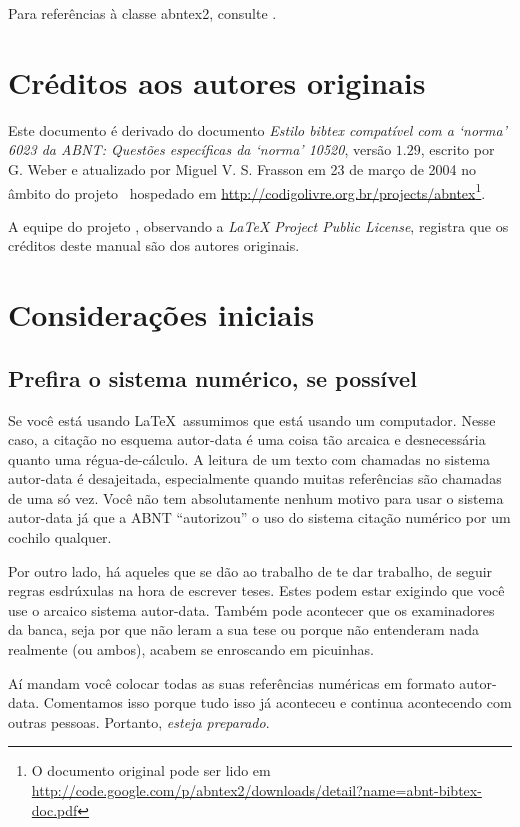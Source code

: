 \documentclass[a4paper]{ltxdoc}
\begin{document}
Para referências à classe \textsf{abntex2}, consulte .

\section{Créditos aos autores originais}

Este documento é derivado do documento \emph{Estilo bibtex compatível com a
`norma' 6023 da ABNT: Questões específicas da `norma' 10520}, versão $ 1.29
$, escrito por G. Weber e atualizado por Miguel V. S. Frasson em 23 de março de
2004 no âmbito do projeto \abnTeX\ hospedado em
\url{http://codigolivre.org.br/projects/abntex}\footnote{O documento original pode ser lido em
\url{http://code.google.com/p/abntex2/downloads/detail?name=abnt-bibtex-doc.pdf}}.

A equipe do projeto , observando a \emph{LaTeX Project Public License},
registra que os créditos deste manual são dos autores originais.


\section{Considerações iniciais}

\subsection{Prefira o sistema numérico, se possível}

Se você está usando \LaTeX\, assumimos que está usando um computador. Nesse
caso, a citação no esquema autor-data é uma coisa tão arcaica e desnecessária
quanto uma régua-de-cálculo. A leitura de um texto com chamadas no sistema
autor-data é desajeitada, especialmente quando muitas referências são chamadas
de uma só vez. Você não tem absolutamente nenhum motivo para usar o sistema
autor-data já que a ABNT ``autorizou'' o uso do sistema citação numérico
por um cochilo qualquer.

Por outro lado, há aqueles que se dão ao trabalho de te dar trabalho, de seguir
regras esdrúxulas na hora de escrever teses. Estes podem estar exigindo que você
use o arcaico sistema autor-data. Também pode acontecer que os examinadores da
banca, seja por que não leram a sua tese ou porque não entenderam nada
realmente (ou ambos), acabem se enroscando em picuinhas.

Aí mandam você colocar todas as suas referências numéricas em formato
autor-data. Comentamos isso porque tudo isso já aconteceu e continua acontecendo 
com outras pessoas. Portanto, \emph{esteja preparado}. 
\end{document}
